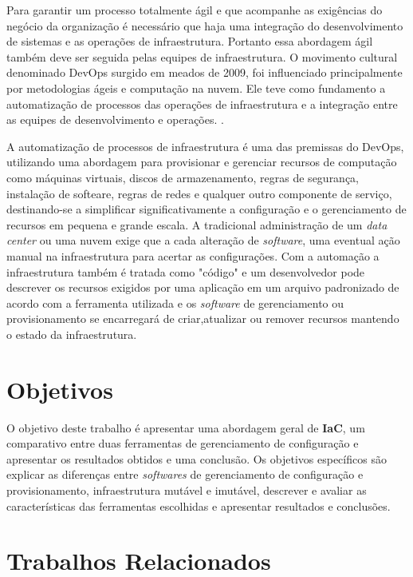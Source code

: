 Para garantir um processo totalmente ágil e que acompanhe as exigências do negócio da organização é necessário que haja uma integração do desenvolvimento de sistemas e as operações de infraestrutura. Portanto essa abordagem ágil também deve ser seguida pelas equipes de infraestrutura.
O movimento cultural denominado DevOps surgido em meados de 2009, foi influenciado principalmente por metodologias ágeis e computação na nuvem. Ele teve como fundamento a automatização de processos das operações de infraestrutura e a integração entre as equipes de desenvolvimento e operações. \cite{sato}.

A automatização de processos de infraestrutura é uma das premissas do DevOps, utilizando uma abordagem para provisionar e gerenciar recursos de computação como máquinas virtuais, discos de armazenamento, regras de segurança, instalação de softeare, regras de redes e qualquer outro componente de serviço, destinando-se a simplificar significativamente a configuração e o gerenciamento de recursos em pequena e grande escala. A tradicional administração de um \textit{data center} ou uma nuvem exige que a cada alteração de \textit{software}, uma eventual ação manual na infraestrutura para acertar as configurações. Com a automação a infraestrutura também é tratada como "código" e um desenvolvedor pode descrever os recursos exigidos por uma aplicação em um arquivo padronizado de acordo com a ferramenta utilizada e os \textit{software} de gerenciamento ou provisionamento se encarregará de criar,atualizar ou remover recursos mantendo o estado da infraestrutura. 

\section{\esp Objetivos}

O objetivo deste trabalho é apresentar uma abordagem geral de \textbf{IaC}, um comparativo entre duas ferramentas de gerenciamento de configuração e apresentar os resultados obtidos e uma conclusão. 
Os objetivos específicos são explicar as diferenças entre \textit{softwares} de gerenciamento de configuração e provisionamento, infraestrutura mutável e imutável, descrever e avaliar as características das ferramentas escolhidas e apresentar resultados e conclusões. 

\section{\esp Trabalhos Relacionados}


